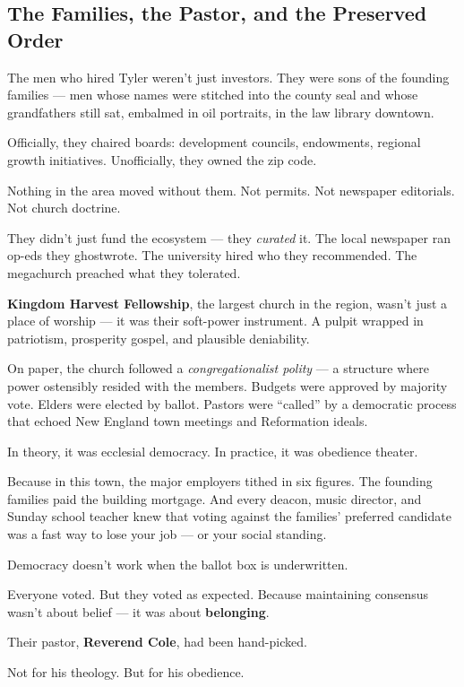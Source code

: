 \subsection{The Families, the Pastor, and the Preserved Order}

The men who hired Tyler weren’t just investors.  
They were sons of the founding families — men whose names were stitched into the county seal and whose grandfathers still sat, embalmed in oil portraits, in the law library downtown.

Officially, they chaired boards: development councils, endowments, regional growth initiatives.  
Unofficially, they owned the zip code.

Nothing in the area moved without them.  
Not permits. Not newspaper editorials. Not church doctrine.

They didn’t just fund the ecosystem — they \textit{curated} it.  
The local newspaper ran op-eds they ghostwrote.  
The university hired who they recommended.  
The megachurch preached what they tolerated.

\textbf{Kingdom Harvest Fellowship}, the largest church in the region, wasn’t just a place of worship — it was their soft-power instrument.  
A pulpit wrapped in patriotism, prosperity gospel, and plausible deniability.

On paper, the church followed a \textit{congregationalist polity} —  
a structure where power ostensibly resided with the members.  
Budgets were approved by majority vote.  
Elders were elected by ballot.  
Pastors were “called” by a democratic process that echoed New England town meetings and Reformation ideals.

In theory, it was ecclesial democracy.  
In practice, it was obedience theater.

Because in this town, the major employers tithed in six figures.  
The founding families paid the building mortgage.  
And every deacon, music director, and Sunday school teacher knew that voting against the families’ preferred candidate  
was a fast way to lose your job — or your social standing.

Democracy doesn’t work when the ballot box is underwritten.

Everyone voted.  
But they voted as expected.  
Because maintaining consensus wasn’t about belief —  
it was about \textbf{belonging}.

Their pastor, \textbf{Reverend Cole}, had been hand-picked.

Not for his theology.  
But for his obedience.

